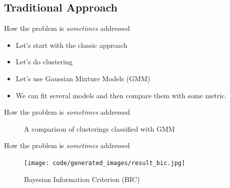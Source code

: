 \documentclass[handout]{beamer}
\begin{document}
\subsection{Traditional Approach}
\begin{frame}{How the problem is \textit{sometimes} addressed}
    \begin{itemize}
        \item Let's start with the classic approach
        \item Let's do clustering
        \item Let's use Gaussian Mixture Models (GMM)
        \item We can fit several models and then compare them with some metric.
    \end{itemize}
\end{frame}

\begin{frame}{How the problem is \textit{sometimes} addressed}
    \begin{figure}[H]
        \centering
        \quad
        \quad
        \quad
        \caption{A comparison of clusterings classified with GMM}
    \end{figure}
\end{frame}

\begin{frame}{How the problem is \textit{sometimes} addressed}
    \begin{figure}[H]
        \centering
        \texttt{[image: code/generated\_images/result\_bic.jpg]}
        \caption{Bayesian Information Criterion (BIC)}
    \end{figure}
\end{frame}
\end{document}
